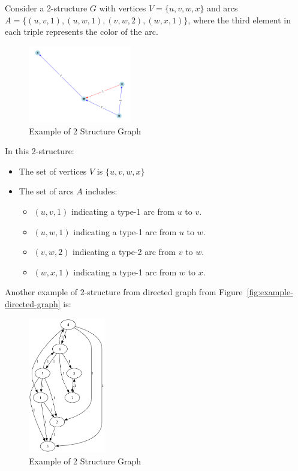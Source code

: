 \begin{myex}[2-Structure]
    Consider a 2-structure $G$ with vertices $V = \{u, v, w, x\}$ and arcs $A = \{(u, v, 1), (u, w, 1), (v, w, 2), (w, x, 1)\}$, where the third element in each triple represents the color of the arc.

    \begin{figure}[!h]
        \centering
        \includegraphics[width=0.40\textwidth]{images/graphs/2_structure_graph_example}
        \caption{Example of 2 Structure Graph}
        \label{fig:2-structure-graph-example-simple}
    \end{figure}

    In this 2-structure:
    \begin{itemize}
        \item The set of vertices $V$ is $\{u, v, w, x\}$
        \item The set of arcs $A$ includes:
        \begin{itemize}
            \item $(u, v, 1)$ indicating a type-1 arc from $u$ to $v$.
            \item $(u, w, 1)$ indicating a type-1 arc from $u$ to $w$.
            \item $(v, w, 2)$ indicating a type-2 arc from $v$ to $w$.
            \item $(w, x, 1)$ indicating a type-1 arc from $w$ to $x$.
        \end{itemize}
    \end{itemize}
\end{myex}

Another example of 2-structure from directed graph from Figure~\ref{fig:example-directed-graph} is:
\begin{myex}
    \begin{figure}[!h]
        \centering
        \includegraphics[width=0.30\textwidth]{images/graphs/digraph_ex1}
        \caption{Example of 2 Structure Graph}
        \label{fig:2-structure-graph-example}
    \end{figure}
\end{myex}


